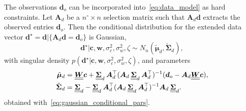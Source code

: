 \documentclass[12pt]{article}
\newcommand{\mybcirc}[1] {\underline{\underline{\bm{#1}}}}
\begin{document}
The observations $\bm{d}_o$ can be incorporated into~\eqref{eq:data_model} as hard constraints.
Let $\bm{A}_d$ be a $n^{\circ} \times n$ selection matrix such that $\bm{A}_d \bm{d}$ extracts the observed entries $\bm{d}_o$. 
Then the conditional distribution for the extended data vector $\bm{d}^{\star} = \bm{d} | \{\bm{A}_d \bm{d} = \bm{d}_o \}$ is Gaussian,
\begin{equation} \label{eq:data_constrained_prior}
\bm{d}^{\star}|\bm{c},\bm{w},\sigma_c^2,\sigma_w^2,\zeta \sim N_n(\tilde{\bm{\mu}}_d, \tilde{\bm{\Sigma}}_d),
\end{equation}
with singular density $p(\bm{d}^{\star}|\bm{c},\bm{w},\sigma_c^2,\sigma_w^2,\zeta)$, and parameters
\begin{equation} \label{eq:Sigma_d_star}
\begin{split}
    \tilde{\bm{\mu}}_d
    &=
    \mybcirc{W}\bm{c}
    +
    \mybcirc{\Sigma}_d\hspace*{0.07cm} \bm{A}_d^{\top}
    (\bm{A}_d\hspace*{0.07cm} \mybcirc{\Sigma}_d\hspace*{0.07cm} \bm{A}_d^{\top})^{-1}
    (\bm{d}_o-\bm{A}_d\mybcirc{W}\bm{c}), \\
   \tilde{\bm{\Sigma}}_d
   &=
   \mybcirc{\Sigma}_d
   -
   \mybcirc{\Sigma}_d\hspace*{0.07cm} \bm{A}_d^{\top}
   (\bm{A}_d\hspace*{0.07cm} \mybcirc{\Sigma}_d\hspace*{0.07cm} \bm{A}_d^{\top})^{-1}
   \bm{A}_d\hspace*{0.07cm} \mybcirc{\Sigma}_d.
\end{split}
\end{equation}
obtained with~\eqref{eq:gaussian_conditional_pars}.
\end{document}
